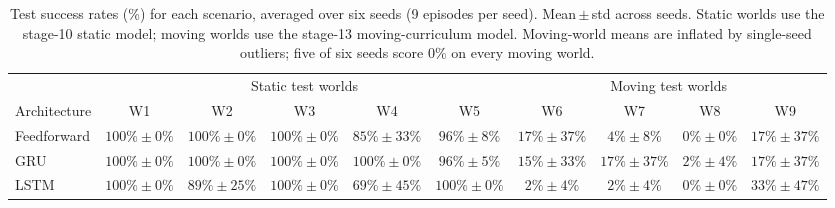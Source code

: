 \begin{table}[htbp]
\centering
\caption{Test success rates (\%) for each scenario, averaged over six seeds (9 episodes per seed). Mean\,$\pm$\,std across seeds. Static worlds use the stage-10 static model; moving worlds use the stage-13 moving-curriculum model. Moving-world means are inflated by single-seed outliers; five of six seeds score $0\%$ on every moving world.}
\label{tab:test}
\begin{tabular}{lccccccccc}
\toprule
 & \multicolumn{5}{c}{Static test worlds} & \multicolumn{4}{c}{Moving test worlds} \\
\cmidrule(lr){2-6}\cmidrule(lr){7-10}
Architecture & W1 & W2 & W3 & W4 & W5 & W6 & W7 & W8 & W9 \\
\midrule
Feedforward & $100\%\pm0\%$ & $100\%\pm0\%$ & $100\%\pm0\%$ & $85\%\pm33\%$ & $96\%\pm8\%$ & $17\%\pm37\%$ & $4\%\pm8\%$ & $0\%\pm0\%$ & $17\%\pm37\%$ \\
GRU         & $100\%\pm0\%$ & $100\%\pm0\%$ & $100\%\pm0\%$ & $100\%\pm0\%$ & $96\%\pm5\%$ & $15\%\pm33\%$ & $17\%\pm37\%$ & $2\%\pm4\%$ & $17\%\pm37\%$ \\
LSTM        & $100\%\pm0\%$ & $89\%\pm25\%$ & $100\%\pm0\%$ & $69\%\pm45\%$ & $100\%\pm0\%$ & $2\%\pm4\%$ & $2\%\pm4\%$ & $0\%\pm0\%$ & $33\%\pm47\%$ \\
\bottomrule
\end{tabular}
\end{table}
